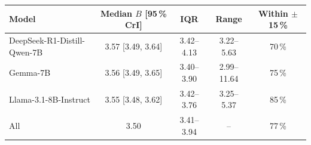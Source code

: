 \begin{tabular}{lcccc}
\toprule
Model & Median $B$ [95\,\% CrI] & IQR & Range & Within $\pm$15\,\% \\
\midrule
DeepSeek-R1-Distill-Qwen-7B & 3.57 [3.49, 3.64] & 3.42--4.13 & 3.22--5.63 & 70\,\% \\
Gemma-7B & 3.56 [3.49, 3.65] & 3.40--3.90 & 2.99--11.64 & 75\,\% \\
Llama-3.1-8B-Instruct & 3.55 [3.48, 3.62] & 3.42--3.76 & 3.25--5.37 & 85\,\% \\
\midrule
All & 3.50 & 3.41--3.94 & -- & 77\,\% \\
\bottomrule
\end{tabular}
